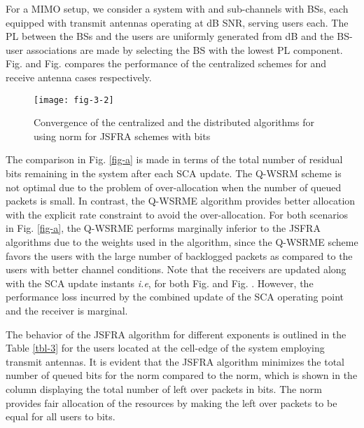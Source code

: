 For a \ac{MIMO} setup, we consider a system with  and  sub-channels with  \acp{BS}, each equipped with  transmit antennas operating at dB \ac{SNR}, serving  users each. The \ac{PL} between the \acp{BS} and the users are uniformly generated from \me{[0,-3]} dB and the \ac{BS}-user associations are made by selecting the \ac{BS} with the lowest \ac{PL} component. Fig.  and Fig.  compares the performance of the centralized schemes for  and  receive antenna cases respectively.
\begin{figure}
	\centering
	\texttt{[image: fig-3-2]}
	\vspace{-0.3in}
	\caption{Convergence of the centralized and the distributed algorithms for  using  norm for \ac{JSFRA} schemes with  bits}
	\label{fig-d}
\end{figure}

The comparison in Fig. \ref{fig-a} is made in terms of the total number of residual bits remaining in the system after each \ac{SCA} update. The \ac{Q-WSRM} scheme is not optimal due to the problem of over-allocation when the number of queued packets is small. In contrast, the \ac{Q-WSRME} algorithm provides better allocation with the explicit rate constraint to avoid the over-allocation. For both scenarios in Fig. \ref{fig-a}, the \ac{Q-WSRME} performs marginally inferior to the \ac{JSFRA} algorithms due to the weights used in the algorithm, since the \ac{Q-WSRME} scheme favors the users with the large number of backlogged packets as compared to the users with better channel conditions. Note that the receivers are updated along with the \ac{SCA} update instants \textit{i.e},  for both Fig.  and Fig. . However, the performance loss incurred by the combined update of the \ac{SCA} operating point and the receiver is marginal.

The behavior of the \ac{JSFRA} algorithm for different exponents  is outlined in the Table \ref{tbl-3} for the users located at the cell-edge of the system employing  transmit antennas. It is evident that the \ac{JSFRA} algorithm minimizes the total number of queued bits for the  norm compared to the  norm, which is shown in the column displaying the total number of left over packets \me{\chi} in bits. The \me{\ell_{\infty}} norm provides fair allocation of the resources by making the left over packets to be equal for all users to  bits.
